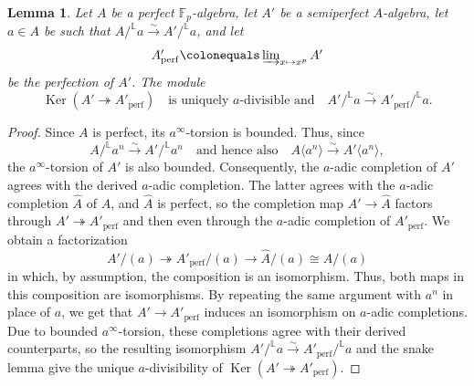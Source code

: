 \documentclass[11pt, reqno]{amsart}
\newcommand{\bF}{\mathbb{F}}
\newcommand{\bL}{\mathbb{L}}
\newcommand{\bZ}{\mathbb{Z}}
\DeclareMathOperator{\Ker}{Ker}		%
\newcommand{\ce}{\colonequals}
\newcommand{\isomto}{\overset{\sim}{\longrightarrow}}
\newcommand{\perf}{\mathrm{perf}}			%
\newcommand{\ra}{\rightarrow}
\newcommand{\surjects}{\twoheadrightarrow}
\newcommand{\wh}{\widehat}
\newcommand{\xra}{\xrightarrow}
\providecommand{\up}[1]{{\upshape(}#1{\upshape)}}
\newcommand{\blem}{\begin{lemma}}
\newcommand{\elem}{\end{lemma}}
\providecommand{\qxq}[1]{\quad\text{#1}\quad}
\newcommand{\tst}{\textstyle}
\newcommand{\bpf}{\begin{proof}}
\newcommand{\epf}{\end{proof}}
\numberwithin{equation}{numberingbase}
\theoremstyle{thms}
\newtheorem{lemma}[numberingbase]{Lemma}
\theoremstyle{claims}
\theoremstyle{defs}
\theoremstyle{thms}
\theoremstyle{defs}
\theoremstyle{subsection-tweak}
\theoremstyle{subsection-tweak}
\begin{document}


\blem \label{lem:auxiliary-perfect-semiperfect-control}
Let $A$ be a perfect $\bF_p$-algebra, let $A'$ be a semiperfect $A$-algebra, let $a \in A$ be such that $A/^\bL a\isomto A'/^\bL a$, and let 
\[
\tst A'_\perf \ce \varinjlim_{x \mapsto x^p} A'
\]
be the perfection of $A'$.   %
The module 
\[
\Ker(A' \surjects A'_\perf) \qxq{is uniquely $a$-divisible and} A'/^\bL a\isomto A'_\perf/^\bL a.
\]
\elem

\bpf
Since $A$ is perfect, its $a^\infty$-torsion is bounded. Thus, since 
\[
A/^\bL a^n \isomto A'/^\bL a^n \qxq{and hence also} A\langle a^n\rangle \isomto A'\langle a^n\rangle,
\] %
the $a^\infty$-torsion of $A'$ is also bounded. Consequently, the $a$-adic completion of $A'$ agrees with the derived $a$-adic completion. The latter agrees with the $a$-adic completion $\wh{A}$ of $A$, and $\wh{A}$ is perfect, so the completion map $A' \ra \wh{A}$ factors through $A' \surjects A'_\perf$ and then even through the $a$-adic completion of $A'_\perf$. We obtain a factorization 
\[
A'/(a) \surjects A'_\perf/(a) \ra \wh{A}/(a) \cong A/(a)
\]%
in which, by assumption, the composition is an isomorphism. Thus, both maps in this composition are isomorphisms. By repeating the same argument with $a^n$ in place of $a$, we get that $A' \ra A'_\perf$ induces an isomorphism on $a$-adic completions. Due to bounded $a^\infty$-torsion, these completions agree with their derived counterparts, so the resulting isomorphism $A'/^\bL a\isomto A'_\perf/^\bL a$ and the snake lemma give the unique $a$-divisibility of  $\Ker(A' \surjects A'_\perf)$.
\epf
\end{document}
